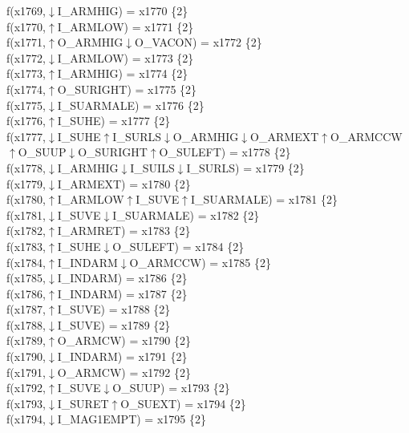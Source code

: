 f(x1769,$\downarrow$I\_ARMHIG) = x1770 \{2\} \\  
f(x1770,$\uparrow$I\_ARMLOW) = x1771 \{2\} \\  
f(x1771,$\uparrow$O\_ARMHIG$\downarrow$O\_VACON) = x1772 \{2\} \\  
f(x1772,$\downarrow$I\_ARMLOW) = x1773 \{2\} \\  
f(x1773,$\uparrow$I\_ARMHIG) = x1774 \{2\} \\  
f(x1774,$\uparrow$O\_SURIGHT) = x1775 \{2\} \\  
f(x1775,$\downarrow$I\_SUARMALE) = x1776 \{2\} \\  
f(x1776,$\uparrow$I\_SUHE) = x1777 \{2\} \\  
f(x1777,$\downarrow$I\_SUHE$\uparrow$I\_SURLS$\downarrow$O\_ARMHIG$\downarrow$O\_ARMEXT$\uparrow$O\_ARMCCW$\uparrow$O\_SUUP$\downarrow$O\_SURIGHT$\uparrow$O\_SULEFT) = x1778 \{2\} \\  
f(x1778,$\downarrow$I\_ARMHIG$\downarrow$I\_SUILS$\downarrow$I\_SURLS) = x1779 \{2\} \\  
f(x1779,$\downarrow$I\_ARMEXT) = x1780 \{2\} \\  
f(x1780,$\uparrow$I\_ARMLOW$\uparrow$I\_SUVE$\uparrow$I\_SUARMALE) = x1781 \{2\} \\  
f(x1781,$\downarrow$I\_SUVE$\downarrow$I\_SUARMALE) = x1782 \{2\} \\  
f(x1782,$\uparrow$I\_ARMRET) = x1783 \{2\} \\  
f(x1783,$\uparrow$I\_SUHE$\downarrow$O\_SULEFT) = x1784 \{2\} \\  
f(x1784,$\uparrow$I\_INDARM$\downarrow$O\_ARMCCW) = x1785 \{2\} \\  
f(x1785,$\downarrow$I\_INDARM) = x1786 \{2\} \\  
f(x1786,$\uparrow$I\_INDARM) = x1787 \{2\} \\  
f(x1787,$\uparrow$I\_SUVE) = x1788 \{2\} \\  
f(x1788,$\downarrow$I\_SUVE) = x1789 \{2\} \\  
f(x1789,$\uparrow$O\_ARMCW) = x1790 \{2\} \\  
f(x1790,$\downarrow$I\_INDARM) = x1791 \{2\} \\  
f(x1791,$\downarrow$O\_ARMCW) = x1792 \{2\} \\  
f(x1792,$\uparrow$I\_SUVE$\downarrow$O\_SUUP) = x1793 \{2\} \\  
f(x1793,$\downarrow$I\_SURET$\uparrow$O\_SUEXT) = x1794 \{2\} \\  
f(x1794,$\downarrow$I\_MAG1EMPT) = x1795 \{2\} \\  
